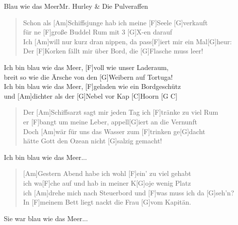 \begin{song}{Blau wie das Meer}{Mr. Hurley \& Die Pulveraffen}

    \begin{verse}
        Schon als [Am]Schiffsjunge hab ich meine [F]Seele [G]verkauft \\
        für ne [F]große Buddel Rum mit 3 [G]X-en darauf \\
        Ich [Am]will nur kurz dran nippen, da pass[F]iert mir ein Mal[G]heur: \\
        Der [F]Korken fällt mir über Bord, die [G]Flasche muss leer!
    \end{verse}
     
    \begin{chorus}
        [C]Ich bin blau wie das Meer, [F]voll wie unser Laderaum, \\
        [Am]breit so wie die Ärsche von den [G]Weibern auf Tortuga! \\
        [C]Ich bin blau wie das Meer, [F]geladen wie ein Bordgeschütz \\
        und [Am]dichter als der [G]Nebel vor Kap [C]Hoorn [G C]
    \end{chorus}
     
    \begin{verse}
        Der [Am]Schiffsarzt sagt mir jeden Tag ich [F]tränke zu viel Rum \\ 
        er [F]bangt um meine Leber, appell[G]iert an die Vernunft \\
        Doch [Am]wär für uns das Wasser zum [F]trinken ge[G]dacht \\
        [F]hätte Gott den Ozean nicht [G]salzig gemacht!
    \end{verse}
     
    \begin{chorus}
        [C]Ich bin blau wie das Meer...
    \end{chorus}
     
    \begin{verse}
        [Am]Gestern Abend habe ich wohl [F]ein' zu viel gehabt \\
        ich wa[F]che auf und hab in meiner K[G]oje wenig Platz \\
        ich [Am]drehe mich nach Steuerbord und [F]was muss ich da [G]seh'n? \\
        In [F]meinem Bett liegt nackt die Frau [G]vom Kapitän.
    \end{verse}
     
    \begin{chorus}
        [C]Sie war blau wie das Meer...
    \end{chorus}
     

\end{song}
